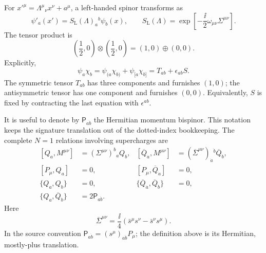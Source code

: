 \begin{enumerate}
  For \(x'^\mu=\Lambda^\mu{}_\nu x^\nu+a^\mu\), a left-handed spinor
  transforms as
  \[
    \psi'_a(x')
      =S_{\mathrm L}(\Lambda)_a{}^b\psi_b(x),
    \qquad
    S_{\mathrm L}(\Lambda)
      =\exp\left[-\frac{\ii}{2}
                   \omega_{\mu\nu}\Sigma^{\mu\nu}\right].
  \]
  The tensor product is
  \[
    \left(\frac12,0\right)\otimes\left(\frac12,0\right)
       =(1,0)\oplus(0,0).
  \]
  Explicitly,
  \[
    \psi_a\chi_b
      =\psi_{(a}\chi_{b)}+\psi_{[a}\chi_{b]}
      =T_{ab}+\epsilon_{ab}S .
  \]
  The symmetric tensor \(T_{ab}\) has three components and furnishes
  \((1,0)\); the antisymmetric tensor has one component and furnishes
  \((0,0)\).  Equivalently, \(S\) is fixed by contracting the last
  equation with \(\epsilon^{ab}\).

  It is useful to denote by \(\mathsf P_{a\dot b}\) the Hermitian momentum
  bispinor.  This notation keeps the signature translation out of the
  dotted-index bookkeeping.  The complete \(N=1\) relations involving
  supercharges are
  \[
  \begin{aligned}
    [Q_a,M^{\mu\nu}]
      &=(\Sigma^{\mu\nu})^b{}_aQ_b,&
    [\overline Q_{\dot a},M^{\mu\nu}]
      &=(\overline\Sigma^{\mu\nu})_{\dot a}{}^{\dot b}
        \overline Q_{\dot b},\\
    [P_\mu,Q_a]&=0,&
    [P_\mu,\overline Q_{\dot a}]&=0,\\
    \{Q_a,Q_b\}&=0,&
    \{\overline Q_{\dot a},\overline Q_{\dot b}\}&=0,\\
    \{Q_a,\overline Q_{\dot b}\}
      &=2\mathsf P_{a\dot b}.&&
  \end{aligned}
  \]
  Here
  \[
    \overline\Sigma^{\mu\nu}
      =\frac{\ii}{4}
         \left(\bar s^\mu s^\nu-\bar s^\nu s^\mu\right).
  \]
  In the source convention
  \(\mathsf P_{a\dot b}=(s^\mu)_{a\dot b}P_\mu\); the definition above is
  its Hermitian, mostly-plus translation.


\end{enumerate}
